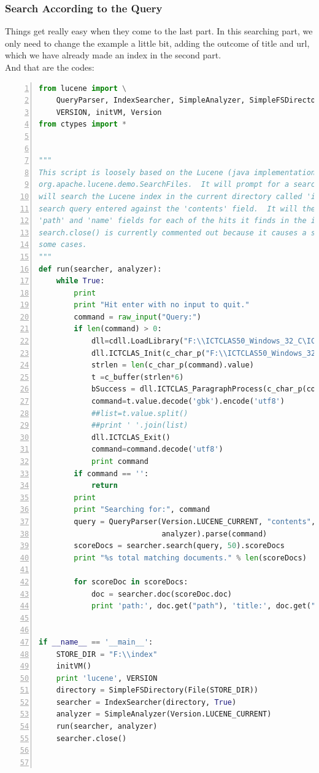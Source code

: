 \documentclass{article}
\begin{document}
\subsubsection{Search According to the Query}
Things get really easy when they come to the last part. In this searching part, we only need to change the example a little bit, adding the outcome of title and url, which we have already made an index in the second part. \\
And that are the codes:\\
\begin{lstlisting}[language=python,numbers=left,frame=leftline]
from lucene import \
    QueryParser, IndexSearcher, SimpleAnalyzer, SimpleFSDirectory, File, \
    VERSION, initVM, Version
from ctypes import *


"""
This script is loosely based on the Lucene (java implementation) demo class
org.apache.lucene.demo.SearchFiles.  It will prompt for a search query, then it
will search the Lucene index in the current directory called 'index' for the
search query entered against the 'contents' field.  It will then display the
'path' and 'name' fields for each of the hits it finds in the index.  Note that
search.close() is currently commented out because it causes a stack overflow in
some cases.
"""
def run(searcher, analyzer):
    while True:
        print
        print "Hit enter with no input to quit."
        command = raw_input("Query:")
        if len(command) > 0:
            dll=cdll.LoadLibrary("F:\\ICTCLAS50_Windows_32_C\ICTCLAS50.dll")
            dll.ICTCLAS_Init(c_char_p("F:\\ICTCLAS50_Windows_32_C"))
            strlen = len(c_char_p(command).value)
            t =c_buffer(strlen*6)
            bSuccess = dll.ICTCLAS_ParagraphProcess(c_char_p(command),c_int(strlen),t,c_int(0),0)
            command=t.value.decode('gbk').encode('utf8')
            ##list=t.value.split()
            ##print ' '.join(list)
            dll.ICTCLAS_Exit()
            command=command.decode('utf8')
            print command
        if command == '':
            return
        print
        print "Searching for:", command
        query = QueryParser(Version.LUCENE_CURRENT, "contents",
                            analyzer).parse(command)
        scoreDocs = searcher.search(query, 50).scoreDocs
        print "%s total matching documents." % len(scoreDocs)

        for scoreDoc in scoreDocs:
            doc = searcher.doc(scoreDoc.doc)
            print 'path:', doc.get("path"), 'title:', doc.get("title"), 'url:', doc.get("url"), 'name:', doc.get("name")


if __name__ == '__main__':
    STORE_DIR = "F:\\index"
    initVM()
    print 'lucene', VERSION
    directory = SimpleFSDirectory(File(STORE_DIR))
    searcher = IndexSearcher(directory, True)
    analyzer = SimpleAnalyzer(Version.LUCENE_CURRENT)
    run(searcher, analyzer)
    searcher.close()



\end{lstlisting}
\end{document}
